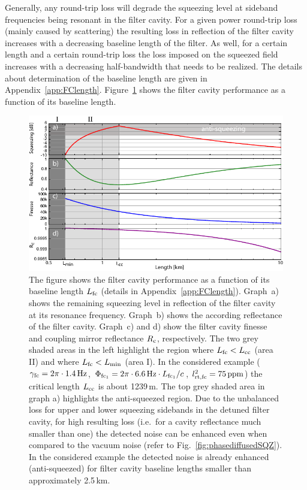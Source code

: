 Generally, any round-trip loss will degrade the squeezing level at
sideband frequencies being resonant in the filter cavity. For a
given power round-trip loss (mainly caused by
scattering) the resulting loss in reflection of the filter cavity
increases with a decreasing baseline length of the
filter. As well, for a certain length and a certain
round-trip loss the loss imposed on the squeezed
field increases with a decreasing half-bandwidth
that needs to be realized. The details about determination of the baseline length are given in Appendix~\ref{app:FClength}. Figure~\ref{fig:length_maintext} shows the filter cavity performance as a function of its baseline length.
\begin{figure}[ht]
\centering
\includegraphics [scale = 1.1]{./Sec_Optics/FCslength75ppmAI.pdf}
\caption{The figure shows the filter cavity performance as a function of its baseline length $L_{\rm fc}$ (details in Appendix~\ref{app:FClength}). Graph~a) shows the remaining squeezing level in reflection of the filter cavity at its resonance frequency. Graph~b) shows the according  reflectance of the filter cavity. Graph~c) and d) show the filter cavity finesse and coupling mirror reflectance $R_{\rm c}$, respectively. The two grey shaded areas in the left highlight the region where $L_{\rm fc}<L_{\rm cc}$ (area II) and where $L_{\rm fc}<L_{\rm min}$ (area I). In the considered example ($\gamma_{\rm fc} =2\pi\cdot1.4\,{\rm Hz}$, $\Phi_{\rm fc_1}= 2\pi\cdot6.6\,{\rm Hz}\cdot L_{\rm fc_1}/c$,  $l^2_{\rm rt,fc}=75\,{\rm ppm}$) the critical length $L_{\rm cc}$ is about 1239\,m. The top grey shaded area in graph a) highlights the anti-squeezed region. Due to the unbalanced loss for upper and lower squeezing sidebands in the detuned filter cavity, for high resulting loss (i.e.\ for a cavity reflectance much smaller than one) the detected noise can be enhanced even when compared to the vacuum noise (refer to Fig.~\ref{fig:phasediffusedSQZ}). In the considered example the detected noise is already enhanced (anti-squeezed) for filter cavity baseline lengths smaller than approximately 2.5\,km.}
\label{fig:length_maintext}
\end{figure}

